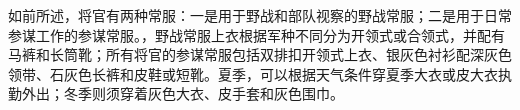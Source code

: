 如前所述，将官有两种常服：一是用于野战和部队视察的野战常服；二是用于日常参谋工作的参谋常服。，野战常服上衣根据军种不同分为开领式或合领式，并配有马裤和长筒靴；所有将官的参谋常服包括双排扣开领式上衣、银灰色衬衫配深灰色领带、石灰色长裤和皮鞋或短靴。夏季，可以根据天气条件穿夏季大衣或皮大衣执勤外出；冬季则须穿着灰色大衣、皮手套和灰色围巾。
